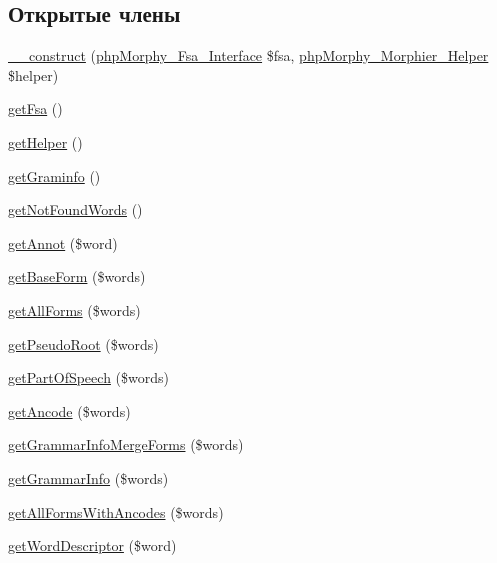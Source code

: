 \subsection*{Открытые члены}
\begin{DoxyCompactItemize}
\item 
\hyperlink{classphpMorphy__Morphier__Bulk_a053a77ebe771d664be0b2ba311c0123b}{\_\-\_\-construct} (\hyperlink{interfacephpMorphy__Fsa__Interface}{phpMorphy\_\-Fsa\_\-Interface} \$fsa, \hyperlink{classphpMorphy__Morphier__Helper}{phpMorphy\_\-Morphier\_\-Helper} \$helper)
\item 
\hyperlink{classphpMorphy__Morphier__Bulk_ab034c58c0da995193a89c73deaffde10}{getFsa} ()
\item 
\hyperlink{classphpMorphy__Morphier__Bulk_abc035a65beacc439b5979ca10fcb9d52}{getHelper} ()
\item 
\hyperlink{classphpMorphy__Morphier__Bulk_a3e3aae83880aa7133bf6d3fd969f9ac4}{getGraminfo} ()
\item 
\hyperlink{classphpMorphy__Morphier__Bulk_acfbcaed353fb5b01d8810f46d1fc2fa4}{getNotFoundWords} ()
\item 
\hyperlink{classphpMorphy__Morphier__Bulk_a7d15f6aa31737d88bb7ba334c099ce16}{getAnnot} (\$word)
\item 
\hyperlink{classphpMorphy__Morphier__Bulk_ad8cdf8c4666b7c7c2831ec3f516455cd}{getBaseForm} (\$words)
\item 
\hyperlink{classphpMorphy__Morphier__Bulk_a2eacf7ee44eb3bce064a6affb6a37a83}{getAllForms} (\$words)
\item 
\hyperlink{classphpMorphy__Morphier__Bulk_ad1f32a29ec49fb09b46b5f0fc10a9a1c}{getPseudoRoot} (\$words)
\item 
\hyperlink{classphpMorphy__Morphier__Bulk_a63edbbc419cb047e191426434ef76ea2}{getPartOfSpeech} (\$words)
\item 
\hyperlink{classphpMorphy__Morphier__Bulk_a0685799f84965f63a45476041b0cc1fd}{getAncode} (\$words)
\item 
\hyperlink{classphpMorphy__Morphier__Bulk_a80e547bb618f5cfda176a93076ed0775}{getGrammarInfoMergeForms} (\$words)
\item 
\hyperlink{classphpMorphy__Morphier__Bulk_a35e263d0557a9ab278759034169e15b3}{getGrammarInfo} (\$words)
\item 
\hyperlink{classphpMorphy__Morphier__Bulk_a7e6f74468f8ade3f7e81fc0fbf2dfbf6}{getAllFormsWithAncodes} (\$words)
\item 
\hyperlink{classphpMorphy__Morphier__Bulk_a0c922d62a98284313bdca61831099f6c}{getWordDescriptor} (\$word)
\end{DoxyCompactItemize}

